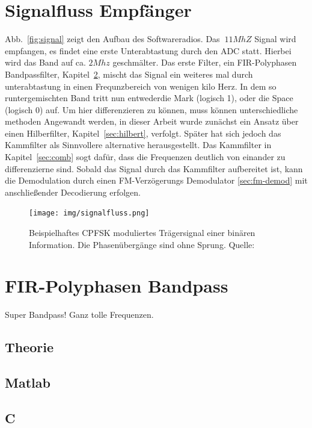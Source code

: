 \documentclass{article}
\begin{document}
\section{Signalfluss Empfänger}

Abb.~\ref{fig:signal} zeigt den Aufbau des Softwareradios. Das $~11MhZ$ Signal wird empfangen, es findet eine erste Unterabtastung durch den ADC statt.
Hierbei wird das Band auf ca. $2Mhz$ geschmälter. Das erste Filter, ein FIR-Polyphasen Bandpassfilter, Kapitel~\ref{sec:FIR}, mischt das Signal ein weiteres mal durch unterabtastung in einen Frequnzbereich
von wenigen kilo Herz. In dem so runtergemischten Band tritt nun entwederdie Mark (logisch 1), oder die Space (logisch 0) auf. Um hier differenzieren zu können,
muss können unterschiedliche methoden Angewandt werden, in dieser Arbeit wurde zunächst ein Ansatz über einen Hilberfilter, Kapitel~\ref{sec:hilbert}, verfolgt. Später hat sich jedoch das Kammfilter
als Sinnvollere alternative herausgestellt. Das Kammfilter in Kapitel~\ref{sec:comb} sogt dafür, dass die Frequenzen deutlich von einander zu differenzierne sind. Sobald das Signal durch das Kammfilter
aufbereitet ist, kann die Demodulation durch einen FM-Verzögerungs Demodulator \ref{sec:fm-demod} mit anschließender Decodierung erfolgen.

\begin{figure}[!h]
    \centering
    \texttt{[image: img/signalfluss.png]}
    \caption{Beispielhaftes \ac{CPFSK} moduliertes Trägersignal einer binären 
    Information. Die Phasenübergänge sind ohne Sprung. Quelle:~\cite{wiki:fsk}}
    \label{fsk}
\end{figure}
\section{FIR-Polyphasen Bandpass}\label{sec:FIR}
Super Bandpass! Ganz tolle Frequenzen. 

\subsection{Theorie}

\subsection{Matlab}

\subsection{C}
\end{document}
